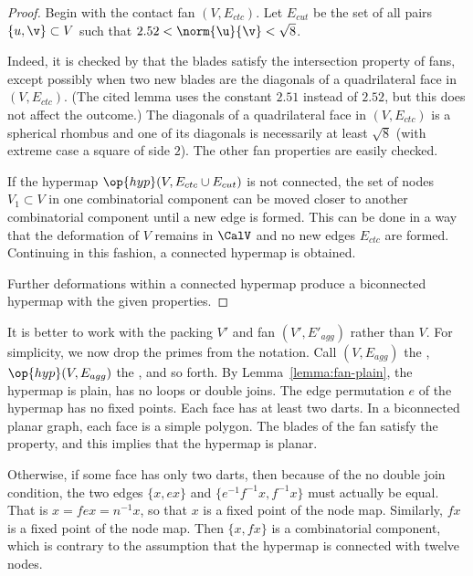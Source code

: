\begin{proof}
Begin with the contact fan $(V,E_{ctc})$.
Let $E_{cut}$ be the set of all pairs $\{u,\v\}\subset V$ such that $2.52<\norm{\u}{\v}<\sqrt8$.

 Indeed, it is checked by
\cite[Lemma~4.30]{Hales:2006:DCG} that the blades satisfy the
intersection property of fans, except possibly when two new blades are
the diagonals of a quadrilateral face in $(V,E_{ctc})$.  (The cited lemma
uses the constant $2.51$ instead of $2.52$, but this does not affect
the outcome.)  The diagonals of a quadrilateral face in $(V,E_{ctc})$
is a spherical rhombus and one of its diagonals is necessarily at
least $\sqrt8$ (with extreme case a square of side $2$).  The other
fan properties are easily checked.

If the hypermap $\op{hyp}(V,E_{ctc}\cup E_{cut})$ is not connected,
the set of nodes $V_1\subset V$ in one combinatorial component can be
moved closer to another combinatorial component until a new edge is
formed.  This can be done in a way that the deformation of $V$ remains
in $\CalV$ and no new edges $E_{ctc}$ are formed.  Continuing in this
fashion, a connected hypermap is obtained.

Further deformations within a connected hypermap produce a biconnected
hypermap with the given properties.
\end{proof}

It is better to work with the packing $V'$ and fan $(V',E'_{agg})$
rather than $V$.  For simplicity, we now drop the primes from the
notation.  Call $(V,E_{agg})$ the ,
$\op{hyp}(V,E_{agg})$ the , and so forth.
By Lemma~\ref{lemma:fan-plain}, the hypermap is plain, has no loops or
double joins.  The edge permutation $e$ of the hypermap has no fixed
points.  Each face has at least two darts.  In a biconnected planar graph, each face is a simple polygon.
The blades of the fan satisfy the  property, and this implies that the hypermap
is planar.

  Otherwise, if some face
has only two darts, then because of the no double join condition, the
two edges $\{x, e x\}$ and $\{ e^{-1} f^{-1} x, f^{-1} x\}$ must actually
be equal.  That is $ x = f e x = n^{-1} x$, so that $x$ is a fixed
point of the node map.  Similarly, $f x$ is a fixed point of the node map.  Then
$\{x, f x\}$ is a combinatorial component, which is contrary to the assumption that
the hypermap is connected with twelve nodes.


